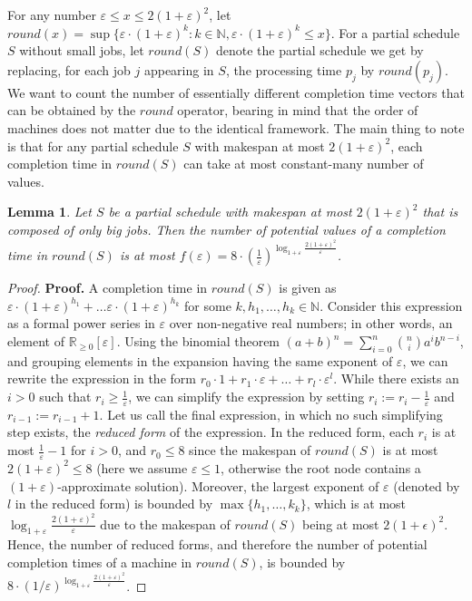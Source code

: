 \documentclass[moor,sglanonrev]{informs4}
\theoremstyle{plain}
\newtheorem{lmm}{Lemma}  %
\begin{document}
For any number $\varepsilon \le x \le 2(1+\varepsilon)^2$, let $round(x)=\sup\{\varepsilon\cdot (1+\varepsilon)^k: k\in \mathbb{N}, \varepsilon\cdot (1+\varepsilon)^k \le x\}$. For a partial schedule $S$ without small jobs, let $round(S)$ denote the partial schedule we get by replacing, for each job $j$ appearing in $S$, the processing time $p_j$ by $round(p_j)$. We want to count the number of essentially different completion time vectors that can be obtained by the $round$ operator, bearing in mind that the order of machines does not matter due to the identical framework. The main thing to note is that for any partial schedule $S$ with makespan at most $2(1+\varepsilon)^2$, each completion time in $round(S)$ can take at most constant-many number of values.

\begin{lmm}\label{varepsilon-grid}
    Let $S$ be a partial schedule with makespan at most $2(1+\varepsilon)^2$ that is composed of only big jobs. Then the number of potential values of a completion time in $round(S)$ is at most $f(\varepsilon)= 8\cdot \left(\frac{1}{\varepsilon}\right)^{\log_{1+\varepsilon} \frac{2(1+\varepsilon)^2}{\varepsilon}}$.
\end{lmm}

\begin{proof}{\textbf{Proof.}}
    A completion time in $round(S)$ is given as $\varepsilon\cdot (1+\varepsilon)^{h_1} + \ldots \varepsilon\cdot (1+\varepsilon)^{h_k}$ for some $k, h_1, \ldots, h_k\in \mathbb{N}$. Consider this expression as a formal power series in $\varepsilon$ over non-negative real numbers; in other words, an element of $\mathbb{R}_{\ge 0}[\varepsilon]$. Using the binomial theorem $(a+b)^n = \sum\limits_{i=0}^n \binom{n}{i}a^i b^{n-i}$, and grouping elements in the expansion having the same exponent of $\varepsilon$, we can rewrite the expression in the form $r_0 \cdot 1 + r_1 \cdot \varepsilon + \ldots + r_l \cdot \varepsilon^l$. While there exists an $i>0$ such that $r_i \ge \frac{1}{\varepsilon}$, we can simplify the expression by setting $r_i:=  r_i - \frac{1}{\varepsilon}$ and $r_{i-1}:=  r_{i-1}+1$. Let us call the final expression, in which no such simplifying step exists, the \emph{reduced form} of the expression. In the reduced form, each $r_i$ is at most $\frac{1}{\varepsilon}-1$ for $i>0$, and $r_0 \le 8$ since the makespan of $round(S)$ is at most $2(1+\varepsilon)^2\le 8$ (here we assume $\varepsilon \le 1$, otherwise the root node contains a $(1+\varepsilon)$-approximate solution). Moreover, the largest exponent of $\varepsilon$ (denoted by $l$ in the reduced form) is bounded by $\max\{h_1, \ldots, k_k\}$, which is at most $\log_{1+\varepsilon} \frac{2(1+\varepsilon)^2}{\varepsilon}$ due to the makespan of $round(S)$ being at most $2(1+\epsilon)^2$. Hence, the number of reduced forms, and therefore the number of potential completion times of a machine in $round(S)$, is bounded by $8\cdot (1/\varepsilon)^{\log_{1+\varepsilon} \frac{2(1+\varepsilon)^2}{\varepsilon}}$. \hfill \Halmos
\end{proof}
\end{document}
